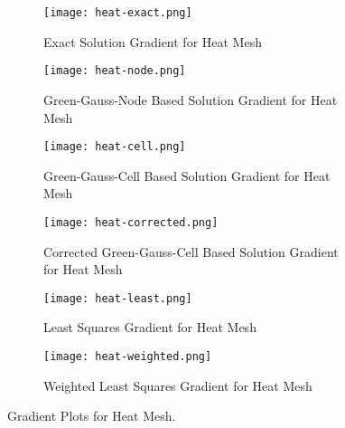 \documentclass{article}
\begin{document}
\begin{figure}[H]
  \centering
  \captionsetup{font=small}
  \begin{subfigure}{.45\textwidth}
    \centering
    \texttt{[image: heat-exact.png]}
    \caption{Exact Solution Gradient for Heat Mesh}
    \label{fig:31}
  \end{subfigure}%
  \hfill
  \begin{subfigure}{.45\textwidth}
    \centering
    \texttt{[image: heat-node.png]}
    \caption{Green-Gauss-Node Based Solution Gradient for Heat Mesh}
    \label{fig:32}
  \end{subfigure}

  \begin{subfigure}{.45\textwidth}
    \centering
    \texttt{[image: heat-cell.png]}
    \caption{Green-Gauss-Cell Based Solution Gradient for Heat Mesh}
    \label{fig:33}
  \end{subfigure}%
  \hfill
  \begin{subfigure}{.45\textwidth}
    \centering
    \texttt{[image: heat-corrected.png]}
    \caption{Corrected Green-Gauss-Cell Based Solution Gradient for Heat Mesh}
    \label{fig:34}
  \end{subfigure}

  \begin{subfigure}{.45\textwidth}
    \centering
    \texttt{[image: heat-least.png]}
    \caption{Least Squares Gradient for Heat Mesh}
    \label{fig:35}
  \end{subfigure}%
  \hfill
  \begin{subfigure}{.45\textwidth}
    \centering
    \texttt{[image: heat-weighted.png]}
    \caption{Weighted Least Squares Gradient for Heat Mesh}
    \label{fig:36}
  \end{subfigure}
  
  \caption{Gradient Plots for Heat Mesh.}
  \label{fig:3}
\end{figure}
\end{document}
